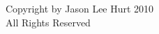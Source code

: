 \newpage
\vspace*{\fill}
\begin{center}
Copyright by Jason Lee Hurt 2010\\
All Rights Reserved
\end{center}
\vspace*{\fill}
